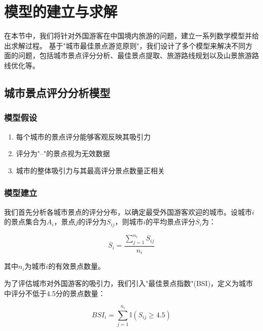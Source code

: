 \documentclass[withoutpreface,bwprint]{cumcmthesis} %
\begin{document}
\section{模型的建立与求解}

在本节中，我们将针对外国游客在中国境内旅游的问题，建立一系列数学模型并给出求解过程。
基于"城市最佳景点游览原则"，我们设计了多个模型来解决不同方面的问题，包括城市景点评分分析、最佳景点提取、旅游路线规划以及山景旅游路线优化等。


\subsection{城市景点评分分析模型}

\subsubsection{模型假设}
\begin{enumerate}
    \item 每个城市的景点评分能够客观反映其吸引力\cite{moraes2013}
    \item 评分为"--"的景点视为无效数据
    \item 城市的整体吸引力与其最高评分景点数量正相关
\end{enumerate}

\subsubsection{模型建立}
我们首先分析各城市景点的评分分布，以确定最受外国游客欢迎的城市。设城市$i$的景点集合为$A_i$，景点$j$的评分为$S_{ij}$，则城市$i$的平均景点评分$\overline{S}_i$为：

\begin{equation}
\overline{S}_i = \frac{\sum_{j=1}^{n_i} S_{ij}}{n_i}
\end{equation}

其中$n_i$为城市$i$的有效景点数量。

为了评估城市对外国游客的吸引力，我们引入"最佳景点指数"(BSI)，定义为城市中评分不低于4.5分的景点数量：

\begin{equation}
BSI_i = \sum_{j=1}^{n_i} \mathbb{I}(S_{ij} \geq 4.5)
\end{equation}
\end{document}
